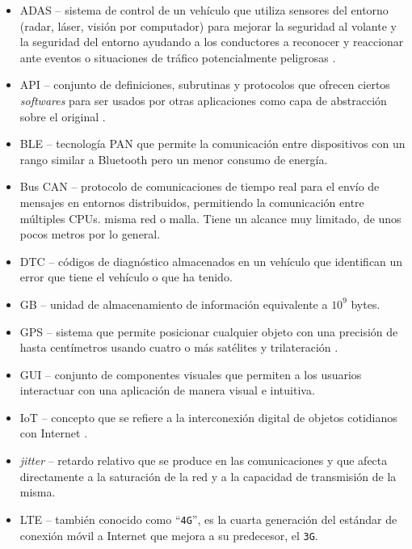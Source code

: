 \begin{itemize}
  \item \ac{ADAS} -- sistema de control de un vehículo que utiliza sensores del entorno
        (radar, láser, visión por computador) para mejorar la seguridad al volante y
        la seguridad del entorno ayudando a los conductores a reconocer y reaccionar
        ante eventos o situaciones de tráfico potencialmente peligrosas \cite{hermawanAcquisitionModelingEvaluating2020}.
  \item \ac{API} -- conjunto de definiciones, subrutinas y protocolos que ofrecen
        ciertos \textit{softwares} para ser usados por otras aplicaciones como
        capa de abstracción sobre el original \cite{InterfazProgramacionAplicaciones2021}.
  \item \ac{BLE} -- tecnología \ac{PAN} que permite la comunicación entre dispositivos
        con un rango similar a Bluetooth pero un menor consumo de energía.
  \item Bus \ac{CAN} -- protocolo de comunicaciones de tiempo real para el envío de
        mensajes en entornos distribuidos, permitiendo la comunicación
        entre múltiples CPUs.
        misma red o malla. Tiene un alcance muy limitado, de unos pocos metros por
        lo general.
  \item \ac{DTC} -- códigos de diagnóstico almacenados en un vehículo que identifican
        un error que tiene el vehículo o que ha tenido.
  \item \ac{GB} -- unidad de almacenamiento de información equivalente a $10^9$ bytes.
  \item \ac{GPS} -- sistema que permite posicionar cualquier objeto con una 
        precisión de hasta centímetros usando cuatro o más satélites y 
        trilateración \cite{GPS2021}.
  \item \ac{GUI} -- conjunto de componentes visuales que permiten a los usuarios
        interactuar con una aplicación de manera visual e intuitiva.
  \item \ac{IoT} -- concepto que se refiere a la interconexión digital de objetos 
        cotidianos con Internet \cite{InternetCosas2021}.
  \item \textit{jitter} -- retardo relativo que se produce en las comunicaciones
        y que afecta directamente a la saturación de la red y a la capacidad de
        transmisión de la misma.
  \item \ac{LTE} -- también conocido como ``\texttt{4G}'', es la cuarta generación
        del estándar de conexión móvil a Internet que mejora a su predecesor, el \texttt{3G}.

\end{itemize}
